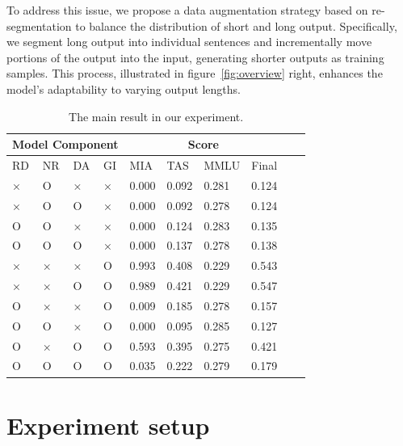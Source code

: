 \documentclass[11pt]{article}
\begin{document}

To address this issue, we propose a data augmentation strategy based on re-segmentation to balance the distribution of short and long output. Specifically, we segment long output into individual sentences and incrementally move portions of the output into the input, generating shorter outputs as training samples. This process, illustrated in figure~\ref{fig:overview} right, enhances the model's adaptability to varying output lengths.




\begin{table}[!t]
  \centering
    \begin{tabular}{llll|llllll}
    \hline
    \multicolumn{4}{c}{\textbf{Model Component}} & \multicolumn{4}{c}{\textbf{Score}} \\ \hline
         RD & NR & DA & GI & MIA & TAS & MMLU & Final \\ \hline
         × & O & × & × & 0.000 & 0.092 & 0.281 & 0.124 \\ \hline
         × & O & O & × & 0.000 & 0.092 & 0.278 & 0.124 \\ \hline
         O & O & × & × & 0.000 & 0.124 & 0.283 & 0.135 \\ \hline
         O & O & O & × & 0.000 & 0.137 & 0.278 & 0.138 \\ \hline
         × & × & × & O & 0.993 & 0.408 & 0.229 & 0.543 \\ \hline
         × & × & O & O & 0.989 & 0.421 & 0.229 & 0.547 \\ \hline
         O & × & × & O & 0.009 & 0.185 & 0.278 & 0.157 \\ \hline
         O & O & × & O & 0.000 & 0.095 & 0.285 & 0.127 \\ \hline
         O & × & O & O & 0.593 & 0.395 & 0.275 & 0.421 \\ \hline
         O & O & O & O & 0.035 & 0.222 & 0.279 & 0.179 \\ \hline
    \end{tabular}
  \caption{
    The main result in our experiment.
  }
  \label{tab:AS2}
\end{table}





\section{Experiment setup}
\end{document}
